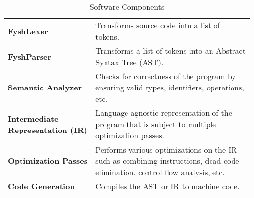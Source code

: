 \newcommand{\sw}[2]{%
	\textbf{#1} & #2 \\%
	\hline%
}
\begin{table}[H]
	\begin{tabularx}{\textwidth}{| a | x |}
		\hline
		 &  \\
		\hline
		\sw{FyshLexer}{Transforms source code into a list of tokens.}
		\sw{FyshParser}{Transforms a list of tokens into an Abstract Syntax Tree (AST).}
		\sw{Semantic Analyzer}{%
			Checks for correctness of the program by ensuring valid types,
			identifiers, operations, etc.}
		\sw{Intermediate Representation (IR)}{%
			Language-agnostic representation of the program that is subject to
			multiple optimization passes.}
		\sw{Optimization Passes}{%
			Performs various optimizations on the IR such as combining instructions,
			dead-code elimination, control flow analysis, etc.}
		\sw{Code Generation}{Compiles the AST or IR to machine code.}
	\end{tabularx}
	\label{Tab:software}
	\caption{Software Components}
\end{table}


